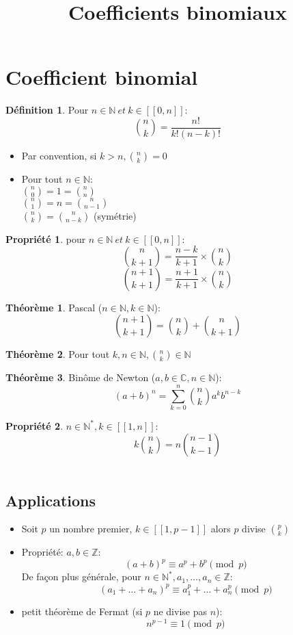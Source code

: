 \documentclass[fleqn]{article}
\title{Coefficients binomiaux}
\date{}
\theoremstyle{definition} \newtheorem*{defi}{D\'efinition}
\theoremstyle{definition} \newtheorem*{theo}{Th\'eor\`eme}
\theoremstyle{definition} \newtheorem*{prop}{Propri\'et\'e}
\begin{document}
\maketitle

\section{Coefficient binomial}
\begin{defi}
	Pour \(n \in \mathbb{N}\ et\ k \in [\![0,n]\!]\): \\
	\[ \binom{n}{k} = \frac{n!}{k!(n-k)!} \]
\end{defi}
\begin{itemize}
	\item Par convention, si $k>n, \binom{n}{k} = 0$
	\item Pour tout \(n \in \mathbb{N}:\) \\
		$\binom{n}{0} = 1 = \binom{n}{n}$ \\
		$\binom{n}{1} = n = \binom{n}{n-1}$ \\
		$\binom{n}{k} = \binom{n}{n-k}$ (sym\'etrie)
\end{itemize}
\begin{prop} pour \(n \in \mathbb{N}\ et\ k \in [\![0,n]\!]\):
	\[\binom{n}{k+1} = \frac{n-k}{k+1} \times \binom{n}{k} \]
	\[\binom{n+1}{k+1} = \frac{n+1}{k+1} \times \binom{n}{k} \]
\end{prop}
\begin{theo} Pascal (\(n \in \mathbb{N}, k \in \mathbb{N}\)): \\
	\[\binom{n+1}{k+1} = \binom{n}{k} + \binom{n}{k+1}\]
\end{theo}
\begin{theo}
	Pour tout \(k,n \in \mathbb{N}, \binom{n}{k} \in \mathbb{N}\)
\end{theo}
\begin{theo} Bin\^{o}me de Newton (\(a,b \in \mathbb{C}, n \in \mathbb{N}\)):
	\[(a+b)^n = \sum_{k=0}^{n} \binom{n}{k}a^kb^{n-k}\]
\end{theo}
\begin{prop} \(n \in \mathbb{N}^*, k \in [\![1,n]\!]\): \\
	\[k\binom{n}{k} = n\binom{n-1}{k-1}\] \\
\end{prop}

\subsection{Applications}
\begin{itemize}
	\item Soit \(p\) un nombre premier, \(k \in [\![1,p-1]\!]\) alors \(p\) divise \(\binom{p}{k}\)
	\item Propri\'{e}t\'{e}: \(a,b \in \mathbb{Z}\):
		\[(a+b)^p \equiv a^p + b^p \pmod{p}\]
		De fa\c{c}on plus g\'en\'erale, pour \(n \in \mathbb{N}^*, a_1, \hdots, a_n \in \mathbb{Z}\):
		\[(a_1+\hdots+a_n)^p \equiv a_1^p+\hdots+a_n^p \pmod{p}\]
	\item petit th\'eor\`eme de Fermat (si \(p\) ne divise pas \(n\)):
		\[n^{p-1} \equiv 1\pmod{p} \]
\end{itemize}
\end{document}
